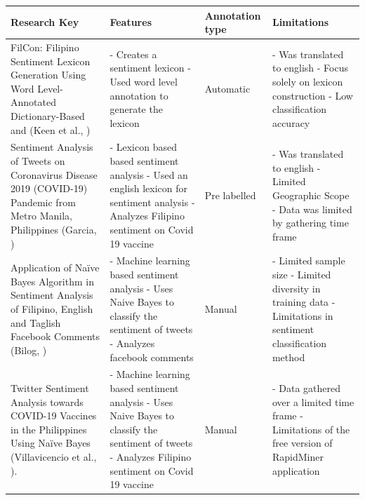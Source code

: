 \begin{table}
	\centering
	\begin{tabular}{|m{10em} | m{7em} | m{5em} | m{7em} |}
		\hline
		Research Key & Features & Annotation type & Limitations \\ [0.5ex]
		\hline
		FilCon: Filipino Sentiment Lexicon Generation Using Word Level-Annotated Dictionary-Based and (Keen et al., \citeyear{Keen2015}) &
		- Creates a sentiment lexicon
		\newline - Used word level annotation to generate the lexicon
		& Automatic &
		- Was translated to english
		\newline - Focus solely on lexicon construction
		\newline - Low classification accuracy \\
		\hline
		Sentiment Analysis of Tweets on Coronavirus Disease 2019 (COVID-19) Pandemic from Metro Manila, Philippines (Garcia, \citeyear{Garcia2020}) &
		- Lexicon based  based sentiment analysis
		\newline - Used an english lexicon for sentiment analysis
		\newline - Analyzes Filipino sentiment on Covid 19 vaccine &
		Pre labelled &
		- Was translated to english
		\newline - Limited Geographic Scope
		\newline - Data was limited by gathering time frame \\
		\hline
		Application of Naïve Bayes Algorithm in Sentiment Analysis of Filipino, English and Taglish Facebook Comments (Bilog, \citeyear{Bilog2020}) &
		- Machine learning based sentiment analysis
		\newline - Uses Naive Bayes to classify the sentiment of tweets
		\newline - Analyzes facebook comments &
		Manual &
		- Limited sample size
		\newline - Limited diversity in training data
		\newline - Limitations in sentiment classification method \\
		\hline
		Twitter Sentiment Analysis towards COVID-19 Vaccines in the Philippines Using Naïve Bayes (Villavicencio et al., \citeyear{Villavicencio2021}). &
		- Machine learning based sentiment analysis
		\newline - Uses Naive Bayes to classify the sentiment of tweets
		\newline - Analyzes Filipino sentiment on Covid 19 vaccine &
		Manual &
		- Data gathered over a limited time frame
		\newline - Limitations of the free version of RapidMiner application \\
		\hline
	\end{tabular}
\end{table}


